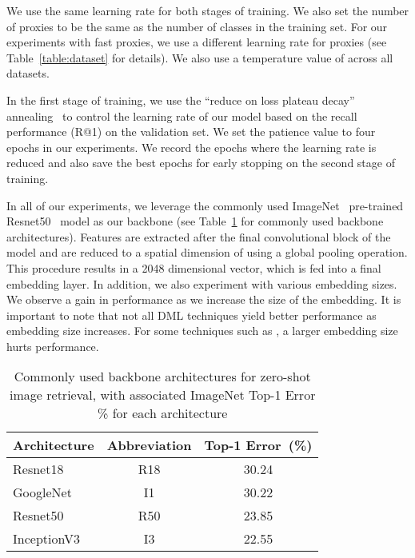 \documentclass[runningheads]{llncs}
\begin{document}
We use the same learning rate for both stages of training.
We also set the number of proxies to be the same as the number of classes in the training set. For our experiments with fast proxies, we use a different learning rate for proxies (see Table~\ref{table:dataset} for details). We also use a temperature value of   across all datasets.


In the first stage of training, we use the ``reduce on loss plateau decay'' annealing~\cite{Goodfellow-et-al-2016} to control the learning rate of our model based on the recall performance (R@1) on the validation set. We set the patience value to four epochs in our experiments. We record the epochs where the learning rate is reduced and also save the best epochs for early stopping on the second stage of training.

In all of our experiments, we leverage the commonly used ImageNet~\cite{ILSVRC15} pre-trained Resnet50~\cite{He_2016_CVPR} model as our backbone (see Table~\ref{table:arch} for commonly used backbone architectures). Features are extracted after the final convolutional block of the model and are reduced to a spatial dimension of  using a global pooling operation. This procedure results in a 2048 dimensional vector, which is fed into a final embedding layer. In addition, we also experiment with various embedding sizes. We observe a gain in performance as we increase the size of the embedding. It is important to note that not all DML techniques yield better performance as embedding size increases. For some techniques such as \cite{wang2019multi,song2016deep}, a larger embedding size hurts performance.

\begin{table}
\centering
\caption{Commonly used backbone architectures for zero-shot image retrieval, with associated ImageNet Top-1 Error \% for each architecture}
\setlength{\tabcolsep}{3pt}
\begin{tabular}{|lcc|}
\hline
Architecture & Abbreviation & Top-1 Error~(\%) \\ \hline
\small{Resnet18~\cite{He_2016_CVPR}}& R18 &30.24 \\
\small{GoogleNet~\cite{I1}} &I1 &  30.22  \\
\small{Resnet50~\cite{He_2016_CVPR}}&R50&  23.85 \\
\small{InceptionV3~\cite{I3}}& I3 & 22.55 \\
\hline
\end{tabular}
\label{table:arch}
\end{table}
\end{document}
